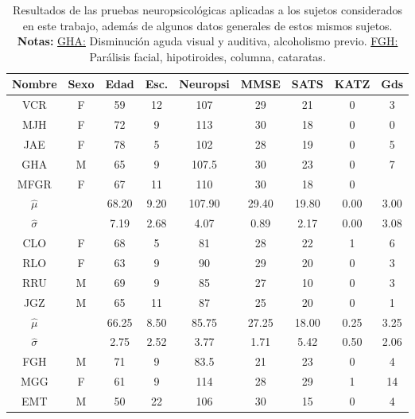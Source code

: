 \begin{table}
\centering
\begin{tabular}{c|ccc|ccccc}
\textbf{Nombre} & \textbf{Sexo} & \textbf{Edad} & \textbf{Esc.} & \textbf{Neuropsi} & \textbf{MMSE} & \textbf{SATS} & \textbf{KATZ} & \textbf{Gds} \\
\hline 
\hline 
VCR    & F    & 59   & 12   & 107      & 29   & 21   & 0    & 3 \\
MJH    & F    & 72   & 9    & 113      & 30   & 18   & 0    & 0 \\
JAE    & F    & 78   & 5    & 102      & 28   & 19   & 0    & 5 \\
GHA    & M    & 65   & 9    & 107.5    & 30   & 23   & 0    & 7 \\
MFGR   & F    & 67   & 11   & 110      & 30   & 18   & 0    &   \\
\hline 
$\widehat{\mu}$ & 
              & 68.20& 9.20 & 107.90   & 29.40& 19.80& 0.00 & 3.00\\
$\widehat{\sigma}$ & 
              & 7.19 & 2.68 & 4.07     & 0.89 & 2.17 & 0.00 & 3.08\\
\hline 
\hline 
CLO    & F    & 68   & 5    & 81       & 28   & 22   & 1    & 6 \\
RLO    & F    & 63   & 9    & 90       & 29   & 20   & 0    & 3 \\
RRU    & M    & 69   & 9    & 85       & 27   & 10   & 0    & 3 \\
JGZ    & M    & 65   & 11   & 87       & 25   & 20   & 0    & 1 \\
\hline 
$\widehat{\mu}$ & 
              & 66.25& 8.50 & 85.75   & 27.25& 18.00& 0.25 & 3.25\\
$\widehat{\sigma}$ & 
              & 2.75 & 2.52 & 3.77    & 1.71 & 5.42 & 0.50 & 2.06\\
\hline 
\hline 
FGH    & M    & 71   & 9    & 83.5     & 21   & 23   & 0    & 4  \\
MGG    & F    & 61   & 9    & 114      & 28   & 29   & 1    & 14 \\
EMT    & M    & 50   & 22   & 106      & 30   & 15   & 0    & 4  \\
\end{tabular} 
\label{tab_sujetos}
\caption{Resultados de las pruebas neuropsicol\'ogicas aplicadas a los sujetos considerados
en este trabajo, adem\'as de algunos datos generales de estos mismos sujetos. \textbf{Notas:}
\underline{GHA:} Disminuci\'on aguda visual y auditiva, alcoholismo previo. 
\underline{FGH:} Par\'alisis facial, hipotiroides, columna, cataratas.}
\end{table}

